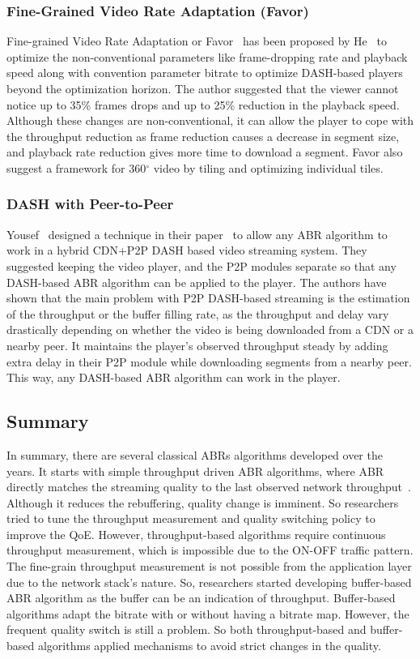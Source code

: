\subsubsection{Fine-Grained Video Rate Adaptation (Favor)}
Fine-grained Video Rate Adaptation or Favor~\cite{10.1145/3204949.3204957} has been proposed by He \etal\ to optimize the non-conventional parameters like frame-dropping rate and playback speed along with convention parameter bitrate to optimize DASH-based players beyond the optimization horizon. The author suggested that the viewer cannot notice up to 35\% frames drops and up to 25\% reduction in the playback speed. Although these changes are non-conventional, it can allow the player to cope with the throughput reduction as frame reduction causes a decrease in segment size, and playback rate reduction gives more time to download a segment. Favor also suggest a framework for 360$^{\circ}$ video by tiling and optimizing individual tiles.

\subsubsection{DASH with Peer-to-Peer}
Yousef \etal\ designed a technique in their paper~\cite{10.1145/3339825.3391859} to allow any ABR algorithm to work in a hybrid CDN+P2P DASH based video streaming system. They suggested keeping the video player, and the P2P modules separate so that any DASH-based ABR algorithm can be applied to the player. The authors have shown that the main problem with P2P DASH-based streaming is the estimation of the throughput or the buffer filling rate, as the throughput and delay vary drastically depending on whether the video is being downloaded from a CDN or a nearby peer. It maintains the player's observed throughput steady by adding extra delay in their P2P module while downloading segments from a nearby peer. This way, any DASH-based ABR algorithm can work in the player.

\subsection{Summary}
In summary, there are several classical ABRs algorithms developed over the years. It starts with simple throughput driven ABR algorithms, where ABR directly matches the streaming quality to the last observed network throughput~\cite{5677508,10.1145/1943552.1943575,10.1145/1943552.1943574}. Although it reduces the rebuffering, quality change is imminent. So researchers tried to tune the throughput measurement and quality switching policy to improve the QoE. However, throughput-based algorithms require continuous throughput measurement, which is impossible due to the ON-OFF traffic pattern. The fine-grain throughput measurement is not possible from the application layer due to the network stack's nature. So, researchers started developing buffer-based ABR algorithm as the buffer can be an indication of throughput. Buffer-based algorithms adapt the bitrate with or without having a bitrate map. However, the frequent quality switch is still a problem. So both throughput-based and buffer-based algorithms applied mechanisms to avoid strict changes in the quality.

